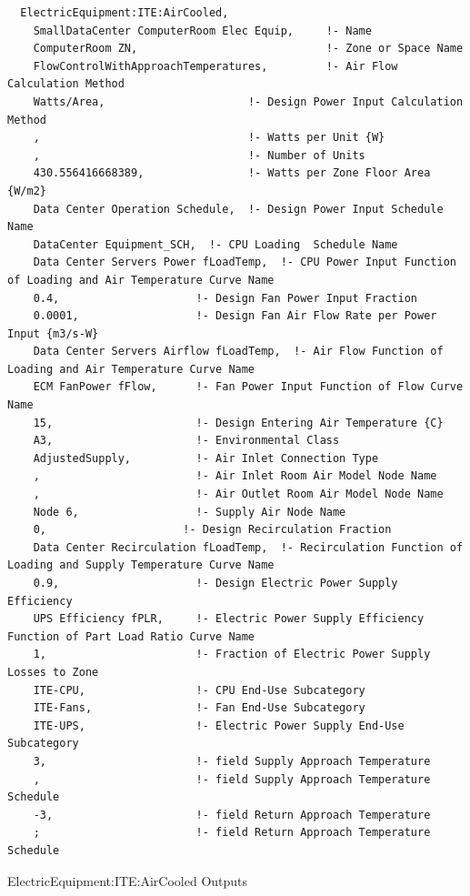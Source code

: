 \begin{lstlisting}
  ElectricEquipment:ITE:AirCooled,
    SmallDataCenter ComputerRoom Elec Equip,     !- Name
    ComputerRoom ZN,                             !- Zone or Space Name
    FlowControlWithApproachTemperatures,         !- Air Flow Calculation Method
    Watts/Area,                      !- Design Power Input Calculation Method
    ,                                !- Watts per Unit {W}
    ,                                !- Number of Units
    430.556416668389,                !- Watts per Zone Floor Area {W/m2}
    Data Center Operation Schedule,  !- Design Power Input Schedule Name
    DataCenter Equipment_SCH,  !- CPU Loading  Schedule Name
    Data Center Servers Power fLoadTemp,  !- CPU Power Input Function of Loading and Air Temperature Curve Name
    0.4,                     !- Design Fan Power Input Fraction
    0.0001,                  !- Design Fan Air Flow Rate per Power Input {m3/s-W}
    Data Center Servers Airflow fLoadTemp,  !- Air Flow Function of Loading and Air Temperature Curve Name
    ECM FanPower fFlow,      !- Fan Power Input Function of Flow Curve Name
    15,                      !- Design Entering Air Temperature {C}
    A3,                      !- Environmental Class
    AdjustedSupply,          !- Air Inlet Connection Type
    ,                        !- Air Inlet Room Air Model Node Name
    ,                        !- Air Outlet Room Air Model Node Name
    Node 6, 			     !- Supply Air Node Name
    0,                     !- Design Recirculation Fraction
    Data Center Recirculation fLoadTemp,  !- Recirculation Function of Loading and Supply Temperature Curve Name
    0.9,                     !- Design Electric Power Supply Efficiency
    UPS Efficiency fPLR,     !- Electric Power Supply Efficiency Function of Part Load Ratio Curve Name
    1,                       !- Fraction of Electric Power Supply Losses to Zone
    ITE-CPU,                 !- CPU End-Use Subcategory
    ITE-Fans,                !- Fan End-Use Subcategory
    ITE-UPS,                 !- Electric Power Supply End-Use Subcategory
    3,                       !- field Supply Approach Temperature
    ,                        !- field Supply Approach Temperature Schedule
    -3,                      !- field Return Approach Temperature
    ;                        !- field Return Approach Temperature Schedule
\end{lstlisting}

ElectricEquipment:ITE:AirCooled Outputs

